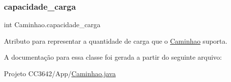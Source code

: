 \subsubsection{\texorpdfstring{capacidade\+\_\+carga}{capacidade\_carga}}
{\footnotesize\ttfamily int Caminhao.\+capacidade\+\_\+carga\hspace{0.3cm}{\ttfamily [private]}}



Atributo para representar a quantidade de carga que o \mbox{\hyperlink{class_caminhao}{Caminhao}} suporta. 



A documentação para essa classe foi gerada a partir do seguinte arquivo\+:\begin{DoxyCompactItemize}
\item 
Projeto C\+C3642/\+App/\mbox{\hyperlink{_caminhao_8java}{Caminhao.\+java}}\end{DoxyCompactItemize}
